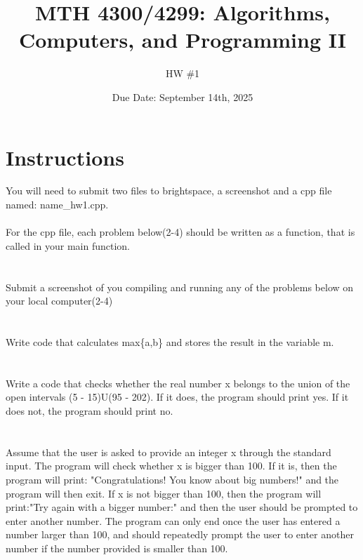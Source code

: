 \documentclass[a4paper]{article}
\title{MTH 4300/4299: Algorithms, Computers, and Programming II}
\author{HW \#1}
\date{Due Date: September 14th, 2025}
\begin{document}
\maketitle

\section*{Instructions}
You will need to submit two files to brightspace, a screenshot and a cpp file named: name\_hw1.cpp.
\\\\
For the cpp file, each problem below(2-4) should be written as a function, that is called in your main function. 


\section{}
Submit a screenshot of you compiling and running any of the problems below on your local computer(2-4)

\section{}
Write code that calculates max\{a,b\} and stores the result in the variable m. 


\section{}
Write a code that checks whether the real number x belongs to the union of the open intervals 
(5 - 15)U(95 - 202). If it does, the program should print yes. If it does not, the program should print no.


\section{}
Assume that the user is asked to provide an integer x through the standard input.
The program will check whether x is bigger than 100. If it is, then the program
will print: "Congratulations! You know about big numbers!" and the program will then exit.
If x is not bigger than 100, then the program will print:"Try again with a bigger number:"
and then the user should be prompted to enter another number. The program can only end once
the user has entered a number larger than 100, and should repeatedly prompt the user to enter 
another number if the number provided is smaller than 100.
\end{document}
